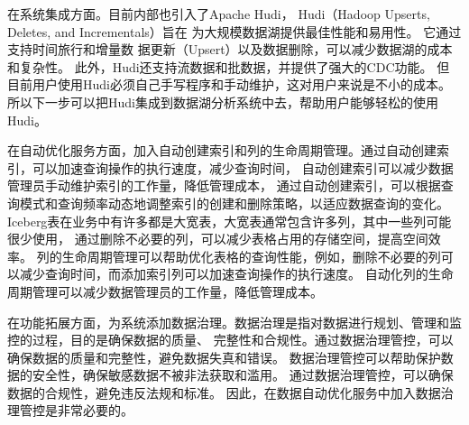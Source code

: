 在系统集成方面。目前内部也引入了Apache Hudi，
Hudi（Hadoop Upserts, Deletes, and Incrementals）旨在
为大规模数据湖提供最佳性能和易用性。 它通过支持时间旅行和增量数
据更新（Upsert）以及数据删除，可以减少数据湖的成本和复杂性。
此外，Hudi还支持流数据和批数据，并提供了强大的CDC功能。
但目前用户使用Hudi必须自己手写程序和手动维护，这对用户来说是不小的成本。
所以下一步可以把Hudi集成到数据湖分析系统中去，帮助用户能够轻松的使用Hudi。

在自动优化服务方面，加入自动创建索引和列的生命周期管理。通过自动创建索引，可以加速查询操作的执行速度，减少查询时间，
自动创建索引可以减少数据管理员手动维护索引的工作量，降低管理成本，
通过自动创建索引，可以根据查询模式和查询频率动态地调整索引的创建和删除策略，以适应数据查询的变化。
Iceberg表在业务中有许多都是大宽表，大宽表通常包含许多列，其中一些列可能很少使用，
通过删除不必要的列，可以减少表格占用的存储空间，提高空间效率。
列的生命周期管理可以帮助优化表格的查询性能，例如，删除不必要的列可以减少查询时间，而添加索引列可以加速查询操作的执行速度。
自动化列的生命周期管理可以减少数据管理员的工作量，降低管理成本。

在功能拓展方面，为系统添加数据治理。数据治理是指对数据进行规划、管理和监控的过程，目的是确保数据的质量、
完整性和合规性。通过数据治理管控，可以确保数据的质量和完整性，避免数据失真和错误。
数据治理管控可以帮助保护数据的安全性，确保敏感数据不被非法获取和滥用。
通过数据治理管控，可以确保数据的合规性，避免违反法规和标准。
因此，在数据自动优化服务中加入数据治理管控是非常必要的。
